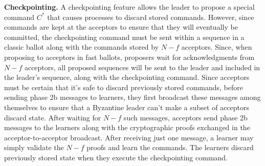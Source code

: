 \noindent \textbf{Checkpointing.} A checkpointing feature allows the leader to propose a special command $C^*$ that causes processes to discard stored commands. However, since commands are kept at the acceptors to ensure that they will eventually be committed, the checkpointing command must be sent within a sequence in a classic ballot along with the commands stored by $N-f$ acceptors. Since, when proposing to acceptors in fast ballots, proposers wait for acknowledgments from $N-f$ acceptors, all proposed sequences will be sent to the leader and included in the leader's sequence, along with the checkpointing command. Since acceptors must be certain that it's safe to discard previously stored commands, before sending phase 2b messages to learners, they first broadcast these messages among themselves to ensure that a Byzantine leader can't make a subset of acceptors discard state. After waiting for $N-f$ such messages, acceptors send phase 2b messages to the learners along with the cryptographic proofs exchanged in the acceptor-to-acceptor broadcast. After receiving just one message, a learner may simply validate the $N-f$ proofs and learn the commands. The learners discard previously stored state when they execute the checkpointing command.